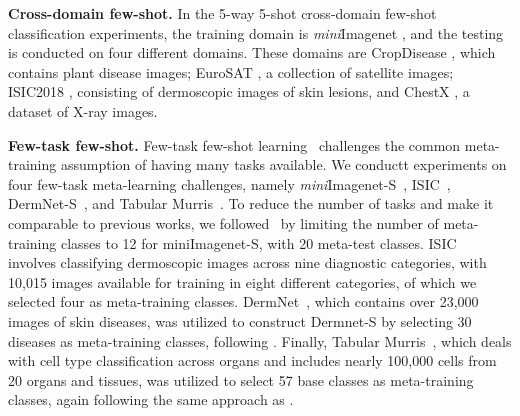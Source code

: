 \textbf{Cross-domain few-shot.}
In the 5-way 5-shot cross-domain few-shot classification experiments, the training domain is \textit{mini}Imagenet \cite{vinyals2016matching}, and the testing is conducted on four different domains. These domains are CropDisease \cite{mohanty2016}, which contains plant disease images; EuroSAT \cite{helber2019eurosat}, a collection of satellite images; ISIC2018 \cite{tschandl2018ham10000}, consisting of dermoscopic images of skin lesions, and ChestX \cite{wang2017chestx}, a dataset of X-ray images.

\textbf{Few-task few-shot.}
Few-task few-shot learning~\cite{yao2021meta} 
challenges the common meta-training assumption of having many tasks available. We conductt experiments on four few-task meta-learning challenges, namely \textit{mini}Imagenet-S~\cite{vinyals2016matching}, ISIC~\cite{milton2019automated}, DermNet-S~\cite{Dermnetdataset}, and Tabular Murris~\cite{cao2020concept}. To reduce the number of tasks and make it comparable to previous works, we followed~\cite{yao2021meta} by limiting the number of meta-training classes to 12 for miniImagenet-S, with 20 meta-test classes. ISIC~\cite{milton2019automated} involves classifying dermoscopic images across nine diagnostic categories, with 10,015 images available for training in eight different categories, of which we selected four as meta-training classes. DermNet~\cite{Dermnetdataset}, which contains over 23,000 images of skin diseases, was utilized to construct Dermnet-S by selecting 30 diseases as meta-training classes, following \cite{yao2021meta}. Finally, Tabular Murris~\cite{cao2020concept}, which deals with cell type classification across organs and includes nearly 100,000 cells from 20 organs and tissues, was utilized to select 57 base classes as meta-training classes, again following the same approach as \cite{yao2021meta}.

